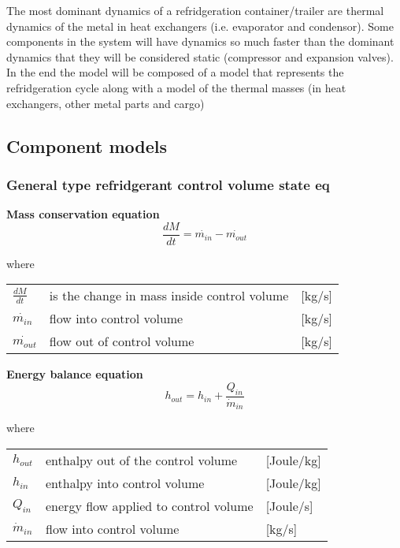 The most dominant dynamics of a refridgeration container/trailer are thermal dynamics of the metal in heat exchangers (i.e. evaporator and condensor). Some components in the system will have dynamics so much faster than the dominant dynamics that they will be considered static (compressor and expansion valves).
In the end the model will be composed of a model that represents the refridgeration cycle along with a model of the thermal masses (in heat exchangers, other metal parts and cargo)


\subsection{Component models}

\subsubsection{General type refridgerant control volume state eq}
\textbf{Mass conservation equation} \\
\begin{equation} \label{eq:GeneralTypeControlVol_MassConservation}
	\frac{dM}{dt} = \dot{m_{in}} - \dot{m_{out}}
\end{equation}

where 
\begin{center}
	\begin{tabular}{l p{8cm} l}
		$\frac{dM}{dt}$ & is the change in mass inside control volume & [\si{kg}/\si{s}]\\ 
		$\dot{m_{in}}$ & flow into control volume & [\si{kg}/\si{s}]\\
		$\dot{m_{out}}$ & flow out of control volume & [\si{kg}/\si{s}]\\
	\end{tabular}
\end{center}

\textbf{Energy balance equation}
\begin{equation}
	h_{out} = h_{in} + \frac{Q_{in}}{\dot{m}_{in}}
\end{equation}

where
\begin{center}
	\begin{tabular}{l p{8cm} l}
		$h_{out}$ & enthalpy out of the control volume & [\si{Joule}/\si{kg}]\\ 
		$h_{in}$ & enthalpy into control volume & [\si{Joule}/\si{kg}]\\ 
		$Q_{in}$ & energy flow applied to control volume& [\si{Joule}/\si{s}]\\
		$\dot{m}_{in}$ & flow into control volume & [\si{kg}/\si{s}]\\
	\end{tabular}
\end{center}

